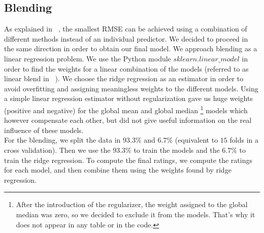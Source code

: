 \documentclass[10pt,conference,compsocconf]{IEEEtran}
\begin{document}
\subsection{Blending}\label{section::blending}
As explained in ~\cite{koren2009bellkor}, the smallest RMSE can be achieved using a combination of different methods instead of an individual predictor. We decided to proceed in the same direction in order to obtain our final model. We approach blending as a linear regression problem. We use the Python module $sklearn.linear\_model$ in order to find the weights for a linear combination of the models (referred to as linear blend in ~\cite{koren2009bellkor}). We choose the ridge regression as an estimator in order to avoid overfitting and assigning meaningless weights to the different models. Using a simple linear regression estimator without regularization gave us huge weights (positive and negative) for the global mean and global median
\footnote{ After the introduction of the regularizer,  the weight assigned to the global median was zero, so we decided to exclude it from the models. That's why it does not appear in any table or in the code.} models which however compensate each other, but did not give useful information on the real influence of these models. \\
For the blending, we split the data in $93.3\% $ and $6.7\%$ (equivalent to $15$ folds in a cross validation). Then we use the $93.3\%$ to train the models and the $6.7\% $ to train the ridge regression. 
To compute the final ratings, we compute the ratings for each model, and then combine them using the weights found by ridge regression.
\end{document}
